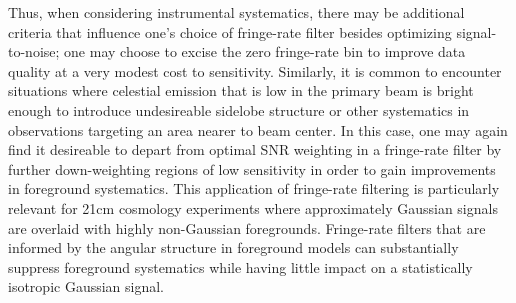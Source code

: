 \documentclass[twocolumn,apj,numberedappendix]{emulateapj}
\begin{document}
Thus, when considering instrumental systematics, there may be additional criteria that influence one's
choice of fringe-rate filter besides optimizing signal-to-noise; one may choose to excise the zero fringe-rate
bin to improve data quality at a very modest cost to sensitivity.  Similarly, it is common to encounter situations
where celestial emission that is low in the primary beam is bright enough to introduce undesireable 
sidelobe structure or other systematics in observations targeting an area nearer to beam center.  In this case,
one may again find it desireable to depart from optimal SNR weighting in a fringe-rate filter
by further down-weighting regions of low sensitivity in order to gain improvements in foreground systematics.
This application of fringe-rate filtering is particularly relevant for 21cm cosmology experiments where approximately
Gaussian signals are overlaid with highly non-Gaussian foregrounds.  Fringe-rate filters that are informed by 
the angular structure in foreground models can substantially suppress foreground systematics while having little
impact on a statistically isotropic Gaussian signal.
\end{document}
